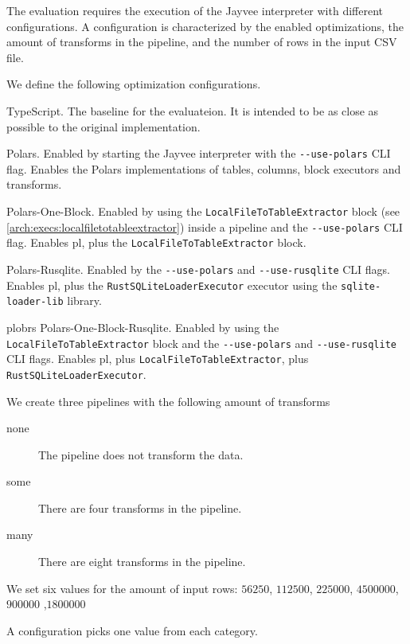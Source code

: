 The evaluation requires the execution of the Jayvee interpreter with different configurations.
A configuration is characterized by the enabled optimizations, the amount of transforms in the pipeline, and the number of rows in the input \ac{CSV} file.

We define the following optimization configurations.
\begin{description}
	\item[ts] TypeScript.
	      The baseline for the evaluateion.
	      It is intended to be as close as possible to the original implementation. %
	\item[pl] Polars.
	      Enabled by starting the Jayvee interpreter with the \Verb|--use-polars| \ac{CLI} flag.
	      Enables the Polars implementations of tables, columns, block executors and transforms.
	\item[plob] Polars-One-Block.
	      Enabled by using the \Verb|LocalFileToTableExtractor| block (see \ref{arch:execs:localfiletotableextractor}) inside a pipeline and the \Verb|--use-polars| \ac{CLI} flag.
	      Enables pl, plus the \Verb|LocalFileToTableExtractor| block.
	\item[plrs] Polars-Rusqlite.
	      Enabled by the \Verb|--use-polars| and \Verb|--use-rusqlite| \ac{CLI} flags.
	      Enables pl, plus the \Verb|RustSQLiteLoaderExecutor| executor using the \Verb|sqlite-loader-lib| library.
	\item{plobrs} Polars-One-Block-Rusqlite.
	      Enabled by using the \Verb|LocalFileToTableExtractor| block and the \Verb|--use-polars| and \Verb|--use-rusqlite| \ac{CLI} flags.
	      Enables pl, plus \Verb|LocalFileToTableExtractor|, plus \Verb|RustSQLiteLoaderExecutor|.
\end{description}

We create three pipelines with the following amount of transforms
\begin{description}
	\item[none] The pipeline does not transform the data.
	\item[some] There are four transforms in the pipeline.
	\item[many] There are eight transforms in the pipeline.
\end{description}

We set six values for the amount of input rows: %
$56250$, $112500$, $225000$, $4500000$, $900000$ ,$1800000$

A configuration picks one value from each category.


